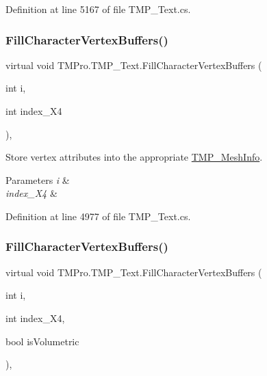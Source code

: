 Definition at line 5167 of file T\+M\+P\+\_\+\+Text.\+cs.

\mbox{\label{class_t_m_pro_1_1_t_m_p___text_a08f26a6f0ccce1042dc32f8a392f4c25}} 
\subsubsection{\texorpdfstring{FillCharacterVertexBuffers()}{FillCharacterVertexBuffers()}\hspace{0.1cm}{\footnotesize\ttfamily [1/2]}}
{\footnotesize\ttfamily virtual void T\+M\+Pro.\+T\+M\+P\+\_\+\+Text.\+Fill\+Character\+Vertex\+Buffers (\begin{DoxyParamCaption}\item[{int}]{i,  }\item[{int}]{index\+\_\+\+X4 }\end{DoxyParamCaption})\hspace{0.3cm}{\ttfamily [protected]}, {\ttfamily [virtual]}}



Store vertex attributes into the appropriate \mbox{\hyperlink{struct_t_m_pro_1_1_t_m_p___mesh_info}{T\+M\+P\+\_\+\+Mesh\+Info}}. 


\begin{DoxyParams}{Parameters}
{\em i} & \\
\hline
{\em index\+\_\+\+X4} & \\
\hline
\end{DoxyParams}


Definition at line 4977 of file T\+M\+P\+\_\+\+Text.\+cs.

\mbox{\label{class_t_m_pro_1_1_t_m_p___text_a9374a227d32695c369007d7ae7f19683}} 
\subsubsection{\texorpdfstring{FillCharacterVertexBuffers()}{FillCharacterVertexBuffers()}\hspace{0.1cm}{\footnotesize\ttfamily [2/2]}}
{\footnotesize\ttfamily virtual void T\+M\+Pro.\+T\+M\+P\+\_\+\+Text.\+Fill\+Character\+Vertex\+Buffers (\begin{DoxyParamCaption}\item[{int}]{i,  }\item[{int}]{index\+\_\+\+X4,  }\item[{bool}]{is\+Volumetric }\end{DoxyParamCaption})\hspace{0.3cm}{\ttfamily [protected]}, {\ttfamily [virtual]}}



